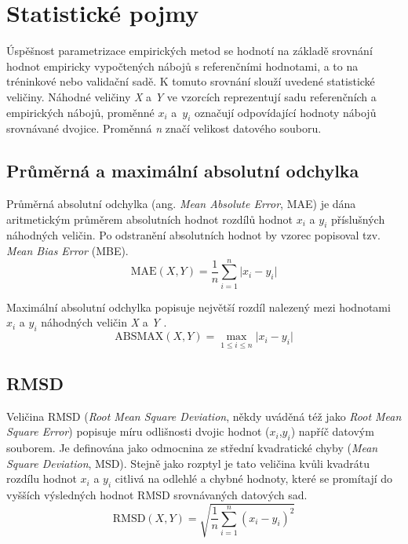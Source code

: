 \section{Statistické pojmy}
Úspěšnost parametrizace empirických metod se hodnotí na základě srovnání hodnot empiricky vypočtených nábojů s referenčními hodnotami, a to na tréninkové nebo validační sadě. K tomuto srovnání slouží uvedené statistické veličiny. Náhodné veličiny \textit{X} a \textit{Y} ve vzorcích reprezentují sadu referenčních a empirických nábojů, proměnné $x_i$ a~$y_i$ označují odpovídající hodnoty nábojů srovnávané dvojice. Proměnná \textit{n} značí velikost datového souboru.

\subsection{Průměrná a maximální absolutní odchylka}
Průměrná absolutní odchylka (ang. \textit{Mean Absolute Error}, MAE) je dána aritmetickým průměrem absolutních hodnot rozdílů hodnot $x_i$ a $y_i$ příslušných náhodných veličin. Po odstranění absolutních hodnot by vzorec popisoval tzv. \textit{Mean Bias Error} (MBE). 
\begin{equation}
    \text{MAE}(X,Y) = \frac{1}{n} \sum_{i=1}^n \lvert x_i - y_i \rvert
\end{equation}

Maximální absolutní odchylka popisuje největší rozdíl nalezený mezi hodnotami $x_i$ a $y_i$ náhodných veličin \textit{X} a \textit{Y} \cite{oxford}.
\begin{equation}
    \text{ABSMAX}(X,Y) = \max_{1 \leq i \leq n} \lvert x_i - y_i \rvert
\end{equation}

\subsection{RMSD}
Veličina RMSD (\textit{Root Mean Square Deviation}, někdy uváděná též jako \textit{Root Mean Square Error}) \cite{rmsd} popisuje míru odlišnosti dvojic hodnot ($x_i$,$y_i$) napříč datovým souborem. Je definována jako odmocnina ze střední kvadratické chyby (\textit{Mean Square Deviation}, MSD). Stejně jako rozptyl je tato veličina kvůli kvadrátu rozdílu hodnot $x_i$ a $y_i$ citlivá na odlehlé a chybné hodnoty, které se promítají do vyšších výsledných hodnot RMSD srovnávaných datových sad. 
\begin{equation}
    \text{RMSD}(X,Y) = \sqrt{\frac{1}{n} \sum_{i=1}^n (x_i - y_i)^2} 
\end{equation}
